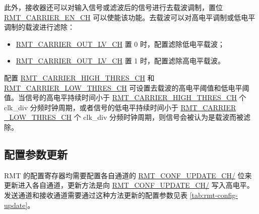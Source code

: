 \documentclass[main\_\_CN.tex]{subfiles}
\begin{document}
此外，接收器还可以对输入信号或滤波后的信号进行去载波调制，置位 \hyperref[fielddesc:RMTCARRIERENCHM]{RMT\_CARRIER\_EN\_CH} 可以使能该功能。去载波可以对高电平调制或低电平调制的载波进行滤除：
\begin{itemize}
    \item \hyperref[fielddesc:RMTCARRIEROUTLVCHM]{RMT\_CARRIER\_OUT\_LV\_CH} 置 0 时，配置滤除低电平载波；
    \item \hyperref[fielddesc:RMTCARRIEROUTLVCHM]{RMT\_CARRIER\_OUT\_LV\_CH} 置 1 时，配置滤除高电平载波。
\end{itemize}

配置 \hyperref[fielddesc:RMTCARRIERHIGHTHRESCHM]{RMT\_CARRIER\_HIGH\_THRES\_CH} 和 \hyperref[fielddesc:RMTCARRIERLOWTHRESCHM]{RMT\_CARRIER\_LOW\_THRES\_CH} 可设置去载波的高电平阈值和低电平阈值。当信号的高电平持续时间小于 \hyperref[fielddesc:RMTCARRIERHIGHTHRESCHM]{RMT\_CARRIER\_HIGH\_THRES\_CH} 个 clk\_div 分频时钟周期，或者信号的低电平持续时间小于 \hyperref[fielddesc:RMTCARRIERLOWTHRESCHM]{RMT\_CARRIER \_LOW\_THRES\_CH} 个 clk\_div 分频时钟周期，则信号会被认为是载波而被滤除。

\subsection{配置参数更新}\label{conf_update}
RMT 的配置寄存器均需要配置各自通道的 \hyperref[fielddesc:RMTCONFUPDATECHN]{RMT\_CONF\_UPDATE\_CH/} 位来更新进入各自通道，更新方法是向 \hyperref[fielddesc:RMTCONFUPDATECHN]{RMT\_CONF\_UPDATE\_CH/} 写入高电平。发送通道和接收通道需要通过这种方法更新的配置参数见表 \ref{tab:rmt-config-update}。
\end{document}
